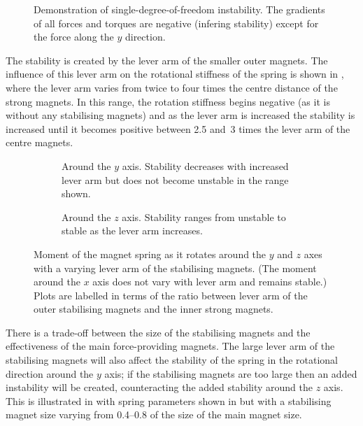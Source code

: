 \begin{figure}
  \caption{
    Demonstration of single-degree-of-freedom instability.
    The gradients of all forces and torques are negative (infering stability)
    except for the force along the $y$ direction.
  }
\end{figure}

The stability is created by the lever arm of the smaller outer magnets.
The influence of this lever arm on the rotational stiffness of the spring is shown in , where the lever arm varies from twice
to four times the centre distance of the strong magnets.
In this range, the rotation stiffness begins negative (as it is without any stabilising magnets) and as the lever arm is increased the stability is increased until it becomes positive between \num{2.5} and~\num{3} times the lever arm of the centre magnets.

\begin{figure}
  \begin{wide}
    \begin{subfigure}
      \caption{Around the $y$ axis. Stability decreases with increased lever arm but does not become unstable in the range shown.}
    \end{subfigure}
    \hfil
    \begin{subfigure}
      \caption{Around the $z$ axis. Stability ranges from unstable to stable as the lever arm increases.}
    \end{subfigure}
  \end{wide}
  \caption{
    Moment of the magnet spring as it rotates around the $y$ and $z$ axes with a varying lever arm of the stabilising magnets.
    (The moment around the $x$ axis does not vary with lever arm and remains stable.)
    Plots are labelled in terms of the ratio between lever arm of the outer stabilising magnets and the inner strong magnets.
  }
\end{figure}

There is a trade-off between the size of the stabilising magnets and the effectiveness of the main force-providing magnets.
The large lever arm of the stabilising magnets will also affect the stability of the spring in the rotational direction around the $y$ axis; if the stabilising magnets are too large then an added instability will be created, counteracting the added stability around the $z$ axis.
This is illustrated in  with spring parameters shown in  but with a stabilising magnet size varying from \numrange{0.4}{0.8} of the size of the main magnet size.

